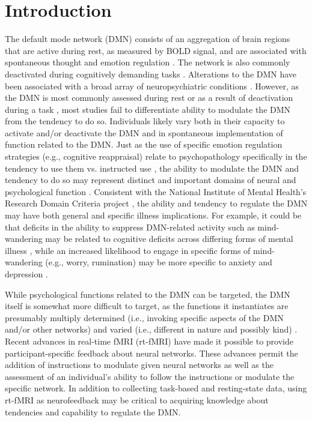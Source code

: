 
\section{Introduction}

The default mode network (DMN) consists of an aggregation of brain regions that are active during rest, as measured by BOLD signal, and are associated with spontaneous thought and emotion regulation \cite{Raichle2001,Andrews-Hanna2014,Buckner2008}. The network is also commonly deactivated during cognitively demanding tasks \cite{Raichle2007}. Alterations to the DMN have been associated with a broad array of neuropsychiatric conditions \cite{Calhoun2008,Whitfield-Gabrieli2012}. However, as the DMN is most commonly assessed during rest \cite{Greicius2002} or as a result of deactivation during a task \cite{Harrison2008}, most studies fail to differentiate ability to modulate the DMN from the tendency to do so. Individuals likely vary both in their capacity to activate and/or deactivate the DMN and in spontaneous implementation of function related to the DMN. Just as the use of specific emotion regulation strategies (e.g., cognitive reappraisal) relate to psychopathology specifically in the tendency to use them vs. instructed use \cite{Ehring2010}, the ability to modulate the DMN and tendency to do so may represent distinct and important domains of neural and psychological function \cite{Anticevic2012}. Consistent with the National Institute of Mental Health’s Research Domain Criteria project \cite{Insel2010}, the ability and tendency to regulate the DMN may have both general and specific illness implications. For example, it could be that deficits in the ability to suppress DMN-related activity such as mind-wandering may be related to cognitive deficits across differing forms of mental illness \cite{Sheline2009}, while an increased likelihood to engage in specific forms of mind-wandering (e.g., worry, rumination) may be more specific to anxiety and depression \cite{Hamilton2011,Sheline2009,Sylvester2012}.

While psychological functions related to the DMN can be targeted, the DMN itself is somewhat more difficult to target, as the functions it instantiates are presumably multiply determined (i.e., invoking specific aspects of the DMN and/or other networks) and varied (i.e., different in nature and possibly kind) \cite{Friston2002}. Recent advances in real-time fMRI (rt-fMRI) \cite{Craddock2012,LaConte2011,Soldati2013} have made it possible to provide participant-specific feedback about neural networks. These advances permit the addition of instructions to modulate given neural networks as well as the assessment of an individual’s ability to follow the instructions or modulate the specific network. In addition to collecting task-based and resting-state data, using rt-fMRI as neurofeedback may be critical to acquiring knowledge about tendencies and capability to regulate the DMN.

